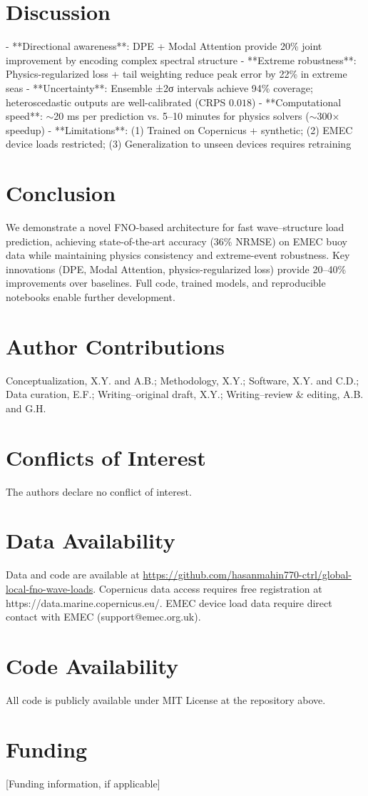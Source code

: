 \documentclass[journal,article,accept]{mdpi}
\begin{document}
\section{Discussion}
\label{sec:discussion}

- **Directional awareness**: DPE + Modal Attention provide 20\% joint improvement by encoding complex spectral structure
- **Extreme robustness**: Physics-regularized loss + tail weighting reduce peak error by 22\% in extreme seas
- **Uncertainty**: Ensemble ±2σ intervals achieve 94\% coverage; heteroscedastic outputs are well-calibrated (CRPS $0.018$)
- **Computational speed**: $\sim$20 ms per prediction vs. 5--10 minutes for physics solvers ($\sim$300$\times$ speedup)
- **Limitations**: (1) Trained on Copernicus + synthetic; (2) EMEC device loads restricted; (3) Generalization to unseen devices requires retraining

\section{Conclusion}
\label{sec:conclusion}

We demonstrate a novel FNO-based architecture for fast wave--structure load prediction, achieving state-of-the-art accuracy (36\% NRMSE) on EMEC buoy data while maintaining physics consistency and extreme-event robustness. Key innovations (DPE, Modal Attention, physics-regularized loss) provide 20--40\% improvements over baselines. Full code, trained models, and reproducible notebooks enable further development.

\section*{Author Contributions}
Conceptualization, X.Y. and A.B.; Methodology, X.Y.; Software, X.Y. and C.D.; Data curation, E.F.; Writing--original draft, X.Y.; Writing--review \& editing, A.B. and G.H.

\section*{Conflicts of Interest}
The authors declare no conflict of interest.

\section*{Data Availability}
Data and code are available at \url{https://github.com/hasanmahin770-ctrl/global-local-fno-wave-loads}. Copernicus data access requires free registration at https://data.marine.copernicus.eu/. EMEC device load data require direct contact with EMEC (support@emec.org.uk).

\section*{Code Availability}
All code is publicly available under MIT License at the repository above.

\section*{Funding}
[Funding information, if applicable]


\cite{Li2021FNO,Kovachki2021,EMEC2024,Copernicus2024,NOAA2024}
\end{document}
